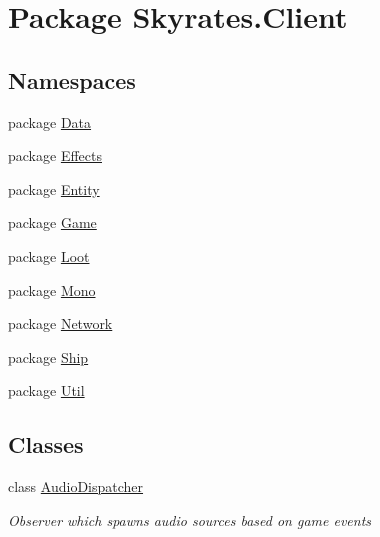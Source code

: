 \hypertarget{namespace_skyrates_1_1_client}{\section{Package Skyrates.\-Client}
\label{namespace_skyrates_1_1_client}
}
\subsection*{Namespaces}
\begin{DoxyCompactItemize}
\item 
package \hyperlink{namespace_skyrates_1_1_client_1_1_data}{Data}
\item 
package \hyperlink{namespace_skyrates_1_1_client_1_1_effects}{Effects}
\item 
package \hyperlink{namespace_skyrates_1_1_client_1_1_entity}{Entity}
\item 
package \hyperlink{namespace_skyrates_1_1_client_1_1_game}{Game}
\item 
package \hyperlink{namespace_skyrates_1_1_client_1_1_loot}{Loot}
\item 
package \hyperlink{namespace_skyrates_1_1_client_1_1_mono}{Mono}
\item 
package \hyperlink{namespace_skyrates_1_1_client_1_1_network}{Network}
\item 
package \hyperlink{namespace_skyrates_1_1_client_1_1_ship}{Ship}
\item 
package \hyperlink{namespace_skyrates_1_1_client_1_1_util}{Util}
\end{DoxyCompactItemize}
\subsection*{Classes}
\begin{DoxyCompactItemize}
\item 
class \hyperlink{class_skyrates_1_1_client_1_1_audio_dispatcher}{Audio\-Dispatcher}
\begin{DoxyCompactList}\small\item\em Observer which spawns audio sources based on game events \end{DoxyCompactList}\end{DoxyCompactItemize}
